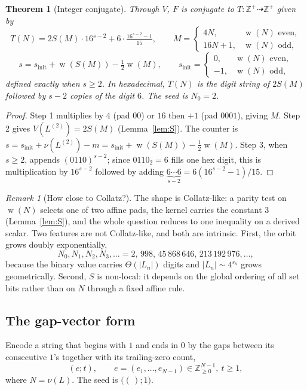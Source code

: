 \documentclass[11pt,reqno]{amsart}
\theoremstyle{plain}
\newtheorem{thm}[theorem]{Theorem}
\theoremstyle{definition}
\theoremstyle{remark}
\newtheorem{remark}{Remark}
\DeclareMathOperator{\popcount}{w}
\begin{document}
\begin{thm}[Integer conjugate]\label{thm:T}
Through $V$, $F$ is conjugate to $T:\mathbb Z^+\dashrightarrow\mathbb Z^+$ given by
\[ T(N)=2S(M)\cdot 16^{s-2}+6\cdot\tfrac{16^{s-2}-1}{15},\qquad M=\begin{cases}4N,& \popcount(N)\text{ even},\\ 16N+1,& \popcount(N)\text{ odd},\end{cases} \]
\[ s=s_{\mathrm{init}}+\popcount(S(M))-\tfrac12\popcount(M),\qquad s_{\mathrm{init}}=\begin{cases}0,& \popcount(N)\text{ even},\\ -1,& \popcount(N)\text{ odd},\end{cases} \]
defined exactly when $s\ge 2$. In hexadecimal, $T(N)$ is the digit string of $2S(M)$ followed by $s-2$ copies of the digit $6$. The seed is $N_0=2$.
\end{thm}
\begin{proof}
Step 1 multiplies by $4$ (pad $00$) or $16$ then $+1$ (pad $0001$), giving $M$. Step 2 gives $V(L^{(2)})=2S(M)$ (Lemma~\ref{lem:S}). The counter is $s=s_{\mathrm{init}}+\nu(L^{(2)})-m=s_{\mathrm{init}}+\popcount(S(M))-\tfrac12\popcount(M)$. Step 3, when $s\ge 2$, appends $(0110)^{s-2}$; since $0110_2=6$ fills one hex digit, this is multiplication by $16^{s-2}$ followed by adding $\underbrace{6\cdots 6}_{s-2}=6(16^{s-2}-1)/15$.
\end{proof}

\begin{remark}[How close to Collatz?]\label{rem:collatz}
The shape is Collatz-like: a parity test on $\popcount(N)$ selects one of two affine pads, the kernel carries the constant $3$ (Lemma~\ref{lem:S}), and the whole question reduces to one inequality on a derived scalar. Two features are not Collatz-like, and both are intrinsic. First, the orbit grows doubly exponentially,
\[ N_0,N_1,N_2,N_3,\dots=2,\,998,\,45\,868\,646,\,213\,192\,976,\dots, \]
because the binary value carries $\Theta(|L_n|)$ digits and $|L_n|\sim 4^{s_n}$ grows geometrically. Second, $S$ is non-local: it depends on the global ordering of all set bits rather than on $N$ through a fixed affine rule.
\end{remark}

\subsection{The gap-vector form}\label{sec:10.3}
Encode a string that begins with $1$ and ends in $0$ by the gaps between its consecutive $1$'s together with its trailing-zero count,
\[ (e;t),\qquad e=(e_1,\dots,e_{N-1})\in\mathbb Z_{\ge 0}^{N-1},\ t\ge 1, \]
where $N=\nu(L)$. The seed is $\bigl((\,);1\bigr)$.
\end{document}
